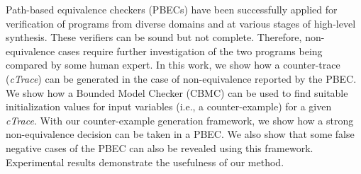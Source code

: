 Path-based equivalence checkers (PBECs) have been successfully applied for verification of 
programs from diverse domains and at various stages of high-level synthesis. 
These verifiers can be sound but not complete. Therefore, non-equivalence cases 
require further investigation of the two programs being compared by some human expert.  
In this work, we show how a counter-trace (\textit{cTrace}) can be generated in the case of 
non-equivalence reported by the PBEC. 
We show how a Bounded Model Checker (CBMC) can be
used to find suitable initialization values for input variables (i.e., a
counter-example) for a given \textit{cTrace}.
With our counter-example generation framework, we show how a strong non-equivalence decision 
can be taken in a PBEC. We also show that some false negative cases of the PBEC can also be 
revealed using this framework. Experimental results demonstrate the usefulness
of our method.
